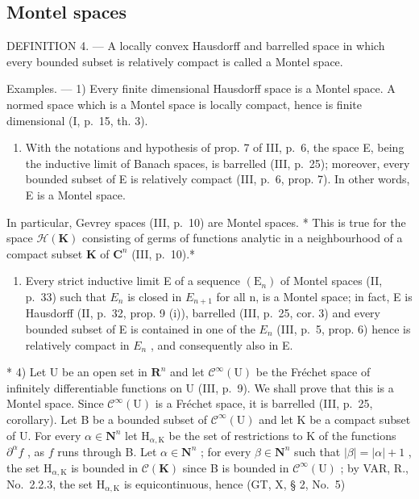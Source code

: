 \subsection{Montel spaces}

DEFINITION 4. --- A locally convex Hausdorff and barrelled space in which every bounded subset is relatively compact is called a Montel space.

Examples. --- 1) Every finite dimensional Hausdorff space is a Montel space. A normed space which is a Montel space is locally compact, hence is finite dimensional (I, p.~15, th. 3).

\begin{enumerate}
\def\labelenumi{\arabic{enumi})}
\setcounter{enumi}{1}
\tightlist
\item
  With the notations and hypothesis of prop. 7 of III, p.~6, the space E, being the inductive limit of Banach spaces, is barrelled (III, p.~25); moreover, every bounded subset of E is relatively compact (III, p.~6, prop. 7). In other words, E is a Montel space.
\end{enumerate}

In particular, Gevrey spaces (III, p.~10) are Montel spaces. * This is true for the space \(\mathcal{H}(\mathbf{K})\) consisting of germs of functions analytic in a neighbourhood of a compact subset \(\mathbf{K}\) of \(\mathbf{C}^n\) (III, p.~10).*

\begin{enumerate}
\def\labelenumi{\arabic{enumi})}
\setcounter{enumi}{2}
\tightlist
\item
  Every strict inductive limit E of a sequence \((\mathrm{E}_{n})\) of Montel spaces (II, p.~33) such that \(E_{n}\) is closed in \(E_{n+1}\) for all n, is a Montel space; in fact, E is Hausdorff (II, p.~32, prop. 9 (i)), barrelled (III, p.~25, cor. 3) and every bounded subset of E is contained in one of the \(E_{n}\) (III, p.~5, prop. 6) hence is relatively compact in \(E_{n}\) , and consequently also in E.
\end{enumerate}

* 4) Let U be an open set in \(\mathbf{R}^n\) and let \(\mathcal{C}^\infty (\mathrm{U})\) be the Fréchet space of infinitely differentiable functions on U (III, p.~9). We shall prove that this is a Montel space. Since \(\mathcal{C}^\infty (\mathrm{U})\) is a Fréchet space, it is barrelled (III, p.~25, corollary). Let B be a bounded subset of \(\mathcal{C}^\infty (\mathrm{U})\) and let K be a compact subset of U. For every \(\alpha \in \mathbf{N}^n\) let \(\mathrm{H}_{\alpha ,\mathrm{K}}\) be the set of restrictions to K of the functions \(\partial^{\alpha}f\) , as \(f\) runs through B. Let \(\alpha \in \mathbf{N}^n\) ; for every \(\beta \in \mathbf{N}^n\) such that \(|\beta | = |\alpha | + 1\) , the set \(\mathrm{H}_{\alpha ,\mathrm{K}}\) is bounded in \(\mathcal{C}(\mathbf{K})\) since B is bounded in \(\mathcal{C}^\infty (\mathrm{U})\) ; by VAR, R., No.~2.2.3, the set \(\mathrm{H}_{\alpha ,\mathrm{K}}\) is equicontinuous, hence (GT, X, § 2, No.~5)

